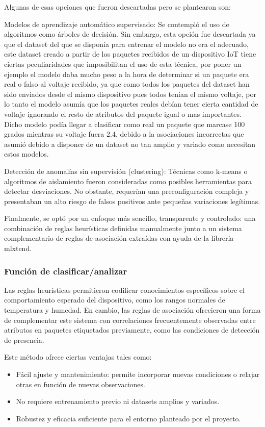 Algunas de esas opciones que fueron descartadas pero se plantearon son:

Modelos de aprendizaje automático supervisado: Se contempló el uso de algoritmos como árboles de decisión. Sin embargo, esta opción fue descartada ya que el dataset del que se disponía para entrenar el modelo no era el adecuado, este dataset creado a partir de los paquetes recibidos de un dispositivo IoT tiene ciertas peculiaridades que imposibilitan el uso de esta técnica, por poner un ejemplo el modelo daba mucho peso a la hora de determinar si un paquete era real o falso al voltaje recibido, ya que como todos los paquetes del dataset han sido enviados desde el mismo dispositivo pues todos tenían el mismo voltaje, por lo tanto el modelo asumía que los paquetes reales debían tener cierta cantidad de voltaje ignorando el resto de atributos del paquete igual o mas importantes. Dicho modelo podía llegar a clasificar como real un paquete  que marcase 100 grados mientras su voltaje fuera 2.4, debido a la asociaciones incorrectas que asumió debido a  disponer de un dataset no tan amplio y variado como necesitan estos modelos.

Detección de anomalías sin supervisión (clustering): Técnicas como k-means o algoritmos de aislamiento fueron consideradas como posibles herramientas para detectar desviaciones. No obstante, requerían una preconfiguración compleja y presentaban un alto riesgo de falsos positivos ante pequeñas variaciones legítimas.

Finalmente, se optó por un enfoque más sencillo, transparente y controlado: una combinación de reglas heurísticas definidas manualmente junto a un sistema complementario de reglas de asociación extraídas con ayuda de la librería mlxtend.

\subsubsection{Función de clasificar/analizar}

Las reglas heurísticas permitieron codificar conocimientos específicos sobre el comportamiento esperado del dispositivo, como los rangos normales de temperatura y humedad. En cambio, las reglas de asociación ofrecieron una forma de complementar este sistema con correlaciones frecuentemente observadas entre atributos en paquetes etiquetados previamente, como las condiciones de detección de presencia.

Este método ofrece ciertas ventajas tales como:
\begin{itemize}
    \item Fácil ajuste y mantenimiento: permite incorporar nuevas condiciones o relajar otras en función de nuevas observaciones.
    \item No requiere entrenamiento previo ni datasets amplios y variados.
    \item Robustez y eficacia suficiente para el entorno planteado por el proyecto.
\end{itemize}

